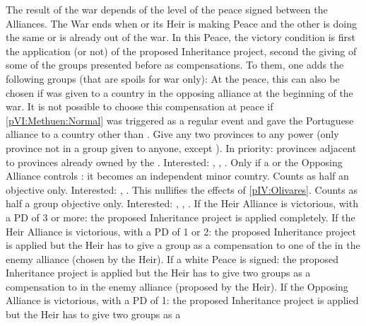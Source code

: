 \begin{digressions}

  \phpaix
  \aparag The result of the war depends of the level of the peace signed
  between the Alliances. The War ends when \SPA or its Heir is making Peace
  and the other is doing the same or is already out of the war.
  \aparag In this Peace, the victory condition is first the application (or
  not) of the proposed Inheritance project, second the giving of some of the
  groups presented before as compensations. To them, one adds the following
  groups (that are spoils for war only):
   At the peace, this can
  also be chosen if \paysportugal was given to a country in the opposing
  alliance at the beginning of the war. It is not possible to choose this
  compensation at peace if \ref{pVI:Methuen:Normal} was triggered as a regular
  event and gave the Portuguese alliance to a country other than \HIS.
   Give any two provinces to any power (only
  province not in a group given to anyone, except \SPA). In priority:
  provinces adjacent to provinces already owned by the \MAJ.  Interested:
  \FRA, \ENG, \AUS.
   Only if a \REVOLT or the Opposing
  Alliance controls \provinceCatalogne: it becomes an independent minor
  country.  Counts as half an objective only.  Interested: \FRA, \ENG.
   This nullifies the effects of
  \ref{pIV:Olivares}.  Counts as half a group objective only.  Interested:
  \FRA, \ENG, \HOL.
  \aparag If the Heir Alliance is victorious, with a PD of 3 or more: the
  proposed Inheritance project is applied completely.
  \aparag If the Heir Alliance is victorious, with a PD of 1 or 2: the
  proposed Inheritance project is applied but the Heir has to give a group as
  a compensation to one of the \MAJ in the enemy alliance (chosen by the
  Heir).
  \aparag If a white Peace is signed: the proposed Inheritance project is
  applied but the Heir has to give two groups as a compensation to \MAJ in the
  enemy alliance (proposed by the Heir).
  \aparag If the Opposing Alliance is victorious, with a PD of 1: the proposed
  Inheritance project is applied but the Heir has to give two groups as a

\end{digressions}
